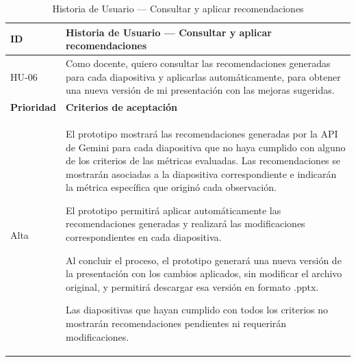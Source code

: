 \documentclass[11pt]{article}
\newcommand{\ttstyle}{%
  \small
  \setlength{\tabcolsep}{6pt}%
  \renewcommand{\arraystretch}{1.25}%
  \arrayrulecolor{azulprofundo}%
}
\newcommand{\hairrule}{%
  \arrayrulecolor{azulregla}\midrule[0.3pt]\arrayrulecolor{azulprofundo}%
}
\begin{document}
\begin{table}[H]
    \centering
    \renewcommand{\arraystretch}{1.2}
    \ttstyle
    \begin{tabular}{p{2.5cm}p{11cm}}
        \toprule
        \textbf{ID} & \textbf{Historia de Usuario --- Consultar y aplicar recomendaciones} \\
        \midrule
        HU-06 & Como docente, quiero consultar las recomendaciones generadas para cada diapositiva y aplicarlas automáticamente, para obtener una nueva versión de mi presentación con las mejoras sugeridas. \\
        \hairrule
        \textbf{Prioridad} & \textbf{Criterios de aceptación} \\
        \hairrule
        Alta & El prototipo mostrará las recomendaciones generadas por la API de Gemini para cada diapositiva que no haya cumplido con alguno de los criterios de las métricas evaluadas. Las recomendaciones se mostrarán asociadas a la diapositiva correspondiente e indicarán la métrica específica que originó cada observación. 
        
        El prototipo permitirá aplicar automáticamente las recomendaciones generadas y realizará las modificaciones correspondientes en cada diapositiva.

        Al concluir el proceso, el prototipo generará una nueva versión de la presentación con los cambios aplicados, sin modificar el archivo original, y permitirá descargar esa versión en formato .pptx.
        
        Las diapositivas que hayan cumplido con todos los criterios no mostrarán recomendaciones pendientes ni requerirán modificaciones. \\
        \bottomrule
    \end{tabular}
    \caption{Historia de Usuario — Consultar y aplicar recomendaciones}
    \label{tab:hu-consultar-recomendaciones}
\end{table}
\end{document}
